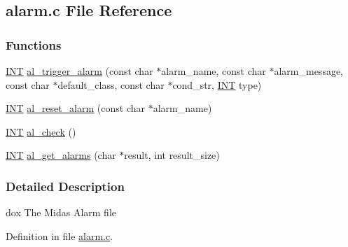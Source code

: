 \subsection{alarm.c File Reference}
\label{alarm_8c}
\subsubsection*{Functions}
\begin{DoxyCompactItemize}
\item 
\hyperlink{vppg_8h_a392e62da233ed3e2f7c3fd4f487a3896}{INT} \hyperlink{group__alfunctioncode_gac024cd8160dc8b9418f05a63678f6c68}{al\_\-trigger\_\-alarm} (const char $\ast$alarm\_\-name, const char $\ast$alarm\_\-message, const char $\ast$default\_\-class, const char $\ast$cond\_\-str, \hyperlink{vppg_8h_a392e62da233ed3e2f7c3fd4f487a3896}{INT} type)
\item 
\hyperlink{vppg_8h_a392e62da233ed3e2f7c3fd4f487a3896}{INT} \hyperlink{group__alfunctioncode_gab555780bdb676810330f6a7cbbeaaf30}{al\_\-reset\_\-alarm} (const char $\ast$alarm\_\-name)
\item 
\hyperlink{vppg_8h_a392e62da233ed3e2f7c3fd4f487a3896}{INT} \hyperlink{group__alfunctioncode_gaf31864a8bc5fe779057e81bde12167a9}{al\_\-check} ()
\item 
\hyperlink{vppg_8h_a392e62da233ed3e2f7c3fd4f487a3896}{INT} \hyperlink{group__alfunctioncode_gabe1fa087b5c911dae39042bc768bf9c8}{al\_\-get\_\-alarms} (char $\ast$result, int result\_\-size)
\end{DoxyCompactItemize}


\subsubsection{Detailed Description}
dox The Midas Alarm file 

Definition in file \hyperlink{alarm_8c_source}{alarm.c}.